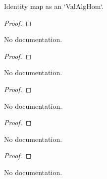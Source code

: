 \begin{theorem}\label{ValAlgHom.coe_id}
        \leanok
                Identity map as an `ValAlgHom`.
    \end{theorem}

\begin{proof}
    \leanok
\end{proof}

\begin{theorem}\label{ValAlgHom.id_toValRingHom}
        \leanok
                No documentation.
    \end{theorem}

\begin{proof}
    \leanok
\end{proof}

\begin{theorem}\label{ValAlgHom.coe_comp}
        \leanok
                No documentation.
    \end{theorem}

\begin{proof}
    \leanok
\end{proof}

\begin{theorem}\label{ValAlgHom.comp_apply}
        \leanok
                No documentation.
    \end{theorem}

\begin{proof}
    \leanok
\end{proof}

\begin{theorem}\label{ValAlgHom.comp_toRingHom}
        \leanok
                No documentation.
    \end{theorem}

\begin{proof}
    \leanok
\end{proof}

\begin{theorem}\label{ValAlgHom.comp_assoc}
        \leanok
                No documentation.
    \end{theorem}

